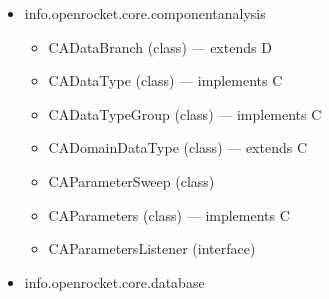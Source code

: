 \documentclass{amsdtx}
\begin{document}
\begin{itemize}
\begin{itemize}
\begin{itemize}
    \item
      BugReporter (class) --- extends C
    \item
      Communicator (class)
    \item
      ConnectionSource (interface)
    \item
      DefaultConnectionSource (class) --- implements C
    \item
      GitHubAPIUtil (class)
    \item
      ReleaseInfo (class)
    \item
      ReleaseNotesHandler (class) --- extends A
    \item
      ReleaseStatus (enum)
    \item
      UpdateCheckerException (class) --- extends E
    \item
      UpdateInfo (class)
    \item
      UpdateInfoFetcher (class) --- extends T
    \item
      UpdateInfoRetriever (class)
    \item
      WelcomeInfoRetriever (class)
    \item
      exists (interface)
    \end{itemize}
  \item
    info.openrocket.core.componentanalysis

    \begin{itemize}
    
    \item
      CADataBranch (class) --- extends D
    \item
      CADataType (class) --- implements C
    \item
      CADataTypeGroup (class) --- implements C
    \item
      CADomainDataType (class) --- extends C
    \item
      CAParameterSweep (class)
    \item
      CAParameters (class) --- implements C
    \item
      CAParametersListener (interface)
    \end{itemize}
  \item
    info.openrocket.core.database

    \begin{itemize}
    

\end{itemize}
\end{itemize}
\end{itemize}
\end{document}
